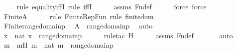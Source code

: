 \begin{isabellebody}
\ \ \ \ \isamarkupfalse%
{\isacharparenleft}{\kern0pt}rule\ equality{\isacharunderscore}{\kern0pt}iffI{\isacharcomma}{\kern0pt}\ rule\ iffI{\isacharparenright}{\kern0pt}\isanewline
\ \ \ \ \isamarkupfalse%
\ assms\ Fn{\isacharunderscore}{\kern0pt}def\isanewline
\ \ \ \ \ \isamarkupfalse%
{\isacharparenleft}{\kern0pt}force{\isacharcomma}{\kern0pt}\ force{\isacharparenright}{\kern0pt}\isanewline
\ \ \ \ \isamarkupfalse%
\isanewline
\isanewline
\ \ \isamarkupfalse%
\ {\isachardoublequoteopen}Finite{\isacharparenleft}{\kern0pt}{\isacharquery}{\kern0pt}A{\isacharparenright}{\kern0pt}{\isachardoublequoteclose}\ \isanewline
\ \ \ \ \isamarkupfalse%
{\isacharparenleft}{\kern0pt}rule\ Finite{\isacharunderscore}{\kern0pt}RepFun{\isacharcomma}{\kern0pt}\ rule\ finitedom{\isacharparenright}{\kern0pt}\isanewline
\ \ \ \ \isamarkupfalse%
\isanewline
\ \ \isamarkupfalse%
\ \isamarkupfalse%
\ {\isachardoublequoteopen}Finite{\isacharparenleft}{\kern0pt}range{\isacharparenleft}{\kern0pt}domain{\isacharparenleft}{\kern0pt}p{\isacharparenright}{\kern0pt}{\isacharparenright}{\kern0pt}{\isacharparenright}{\kern0pt}{\isachardoublequoteclose}\ \isamarkupfalse%
\ {\isacartoucheopen}{\isacharquery}{\kern0pt}A\ {\isacharequal}{\kern0pt}\ range{\isacharparenleft}{\kern0pt}domain{\isacharparenleft}{\kern0pt}p{\isacharparenright}{\kern0pt}{\isacharparenright}{\kern0pt}{\isacartoucheclose}\ \isamarkupfalse%
\ auto\isanewline
\ \ \isamarkupfalse%
\ \isamarkupfalse%
\ {\isachardoublequoteopen}{\isasymexists}x\ {\isasymin}\ nat{\isachardot}{\kern0pt}\ x\ {\isasymnotin}\ range{\isacharparenleft}{\kern0pt}domain{\isacharparenleft}{\kern0pt}p{\isacharparenright}{\kern0pt}{\isacharparenright}{\kern0pt}{\isachardoublequoteclose}\ \isanewline
\ \ \ \ \isamarkupfalse%
{\isacharparenleft}{\kern0pt}rule{\isacharunderscore}{\kern0pt}tac\ H{\isacharparenright}{\kern0pt}\isanewline
\ \ \ \ \isamarkupfalse%
\ assms\ Fn{\isacharunderscore}{\kern0pt}def\ \isanewline
\ \ \ \ \isamarkupfalse%
\ auto\isanewline
\ \ \isamarkupfalse%
\ \isamarkupfalse%
\ m\ \ mH{\isacharcolon}{\kern0pt}\ {\isachardoublequoteopen}m\ {\isasymin}\ nat{\isachardoublequoteclose}\ {\isachardoublequoteopen}m\ {\isasymnotin}\ range{\isacharparenleft}{\kern0pt}domain{\isacharparenleft}{\kern0pt}p{\isacharparenright}{\kern0pt}{\isacharparenright}{\kern0pt}{\isachardoublequoteclose}\ \isamarkupfalse%

\end{isabellebody}
